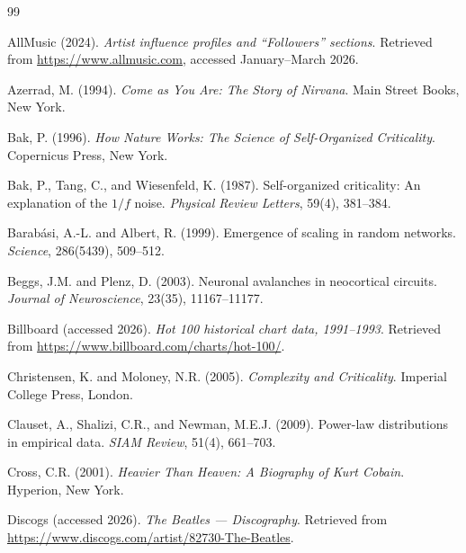 \documentclass[12pt, a4paper]{article}
\begin{document}

\begin{thebibliography}{99}

AllMusic (2024).
\textit{Artist influence profiles and ``Followers'' sections}.
Retrieved from \url{https://www.allmusic.com},
accessed January--March 2026.

Azerrad, M. (1994).
\textit{Come as You Are: The Story of Nirvana}.
Main Street Books, New York.

Bak, P. (1996).
\textit{How Nature Works: The Science of Self-Organized Criticality}.
Copernicus Press, New York.

Bak, P., Tang, C., and Wiesenfeld, K. (1987).
Self-organized criticality: An explanation of the $1/f$ noise.
\textit{Physical Review Letters}, 59(4), 381--384.

Barab\'asi, A.-L. and Albert, R. (1999).
Emergence of scaling in random networks.
\textit{Science}, 286(5439), 509--512.

Beggs, J.M. and Plenz, D. (2003).
Neuronal avalanches in neocortical circuits.
\textit{Journal of Neuroscience}, 23(35), 11167--11177.

Billboard (accessed 2026).
\textit{Hot 100 historical chart data, 1991--1993}.
Retrieved from \url{https://www.billboard.com/charts/hot-100/}.

Christensen, K. and Moloney, N.R. (2005).
\textit{Complexity and Criticality}.
Imperial College Press, London.

Clauset, A., Shalizi, C.R., and Newman, M.E.J. (2009).
Power-law distributions in empirical data.
\textit{SIAM Review}, 51(4), 661--703.

Cross, C.R. (2001).
\textit{Heavier Than Heaven: A Biography of Kurt Cobain}.
Hyperion, New York.

Discogs (accessed 2026).
\textit{The Beatles --- Discography}.
Retrieved from
\url{https://www.discogs.com/artist/82730-The-Beatles}.


\end{thebibliography}
\end{document}
